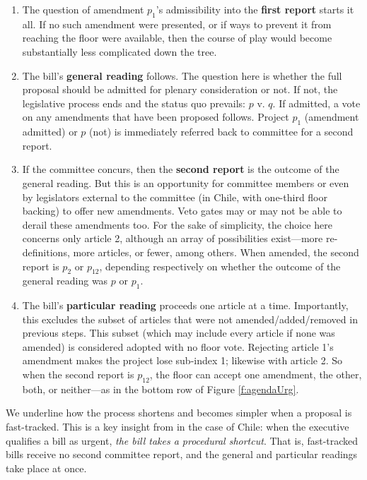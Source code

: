 \documentclass[letter,12pt]{article}
\begin{document}
\begin{enumerate}
\item The question of amendment $p_1$'s admissibility into the \textbf{first report} starts it all. If no such amendment were presented, or if ways to prevent it from reaching the floor were available, then the course of play would become substantially less complicated down the tree. 
\item The bill's \textbf{general reading} follows. The question here is whether the full proposal should be admitted for plenary consideration or not. If not, the legislative process ends and the status quo prevails: $p$ v. $q$. If admitted, a vote on any amendments that have been proposed follows. Project $p_1$ (amendment admitted) or $p$ (not) is immediately referred back to committee for a second report. 
\item If the committee concurs, then the \textbf{second report} is the outcome of the general reading. But this is an opportunity for committee members or even by legislators external to the committee (in Chile, with one-third floor backing) to offer new amendments. Veto gates may or may not be able to derail these amendments too. For the sake of simplicity, the choice here concerns only article 2, although an array of possibilities exist---more re-definitions, more articles, or fewer, among others. When amended, the second report is $p_2$ or $p_{12}$, depending respectively on whether the outcome of the general reading was $p$ or $p_1$. 
\item The bill's \textbf{particular reading} proceeds one article at a time. Importantly, this excludes the subset of articles that were not amended/added/removed in previous steps. This subset (which may include every article if none was amended) is considered adopted with no floor vote. Rejecting article 1's amendment makes the project lose sub-index 1; likewise with article 2. So when the second report is $p_{12}$, the floor can accept one amendment, the other, both, or neither---as in the bottom row of Figure \ref{f:agendaUrg}. 
\end{enumerate}

We underline how the process shortens and becomes simpler when a proposal is fast-tracked. This is a key insight from \citet{sotoCongChile2015} in the case of Chile: when the executive qualifies a bill as urgent, \emph{the bill takes a procedural shortcut}. That is, fast-tracked bills receive no second committee report, and the general and particular readings take place at once.
\end{document}

